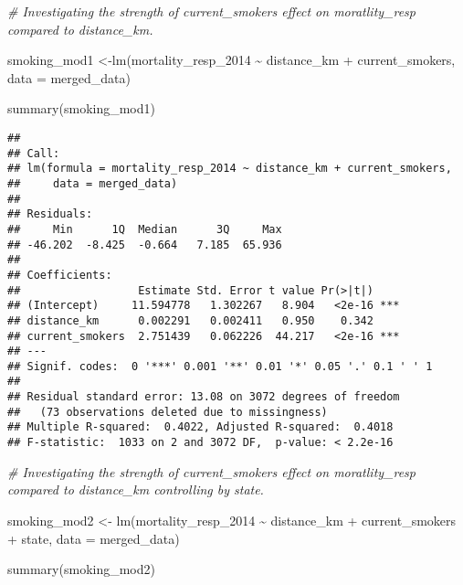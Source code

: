 \documentclass[
]{article}
\newenvironment{Shaded}{\begin{snugshade}}{\end{snugshade}}
\newcommand{\AttributeTok}[1]{\textcolor[rgb]{0.77,0.63,0.00}{#1}}
\newcommand{\CommentTok}[1]{\textcolor[rgb]{0.56,0.35,0.01}{\textit{#1}}}
\newcommand{\FunctionTok}[1]{\textcolor[rgb]{0.00,0.00,0.00}{#1}}
\newcommand{\NormalTok}[1]{#1}
\newcommand{\OtherTok}[1]{\textcolor[rgb]{0.56,0.35,0.01}{#1}}
\newcommand{\SpecialCharTok}[1]{\textcolor[rgb]{0.00,0.00,0.00}{#1}}
\begin{document}
\begin{Shaded}
\begin{Highlighting}[]
\CommentTok{\# Investigating the strength of current\_smokers effect on moratlity\_resp compared to distance\_km. }

\NormalTok{smoking\_mod1 }\OtherTok{\textless{}{-}}\FunctionTok{lm}\NormalTok{(mortality\_resp\_2014 }\SpecialCharTok{\textasciitilde{}}\NormalTok{ distance\_km }\SpecialCharTok{+}\NormalTok{ current\_smokers, }\AttributeTok{data =}\NormalTok{ merged\_data)}

\FunctionTok{summary}\NormalTok{(smoking\_mod1)}
\end{Highlighting}
\end{Shaded}

\begin{verbatim}
## 
## Call:
## lm(formula = mortality_resp_2014 ~ distance_km + current_smokers, 
##     data = merged_data)
## 
## Residuals:
##     Min      1Q  Median      3Q     Max 
## -46.202  -8.425  -0.664   7.185  65.936 
## 
## Coefficients:
##                  Estimate Std. Error t value Pr(>|t|)    
## (Intercept)     11.594778   1.302267   8.904   <2e-16 ***
## distance_km      0.002291   0.002411   0.950    0.342    
## current_smokers  2.751439   0.062226  44.217   <2e-16 ***
## ---
## Signif. codes:  0 '***' 0.001 '**' 0.01 '*' 0.05 '.' 0.1 ' ' 1
## 
## Residual standard error: 13.08 on 3072 degrees of freedom
##   (73 observations deleted due to missingness)
## Multiple R-squared:  0.4022, Adjusted R-squared:  0.4018 
## F-statistic:  1033 on 2 and 3072 DF,  p-value: < 2.2e-16
\end{verbatim}

\begin{Shaded}
\begin{Highlighting}[]
\CommentTok{\# Investigating the strength of current\_smokers effect on moratlity\_resp compared to distance\_km controlling by state. }

\NormalTok{smoking\_mod2 }\OtherTok{\textless{}{-}} \FunctionTok{lm}\NormalTok{(mortality\_resp\_2014 }\SpecialCharTok{\textasciitilde{}}\NormalTok{ distance\_km }\SpecialCharTok{+}\NormalTok{ current\_smokers }\SpecialCharTok{+}\NormalTok{ state, }\AttributeTok{data =}\NormalTok{ merged\_data)}

\FunctionTok{summary}\NormalTok{(smoking\_mod2)}
\end{Highlighting}
\end{Shaded}
\end{document}
